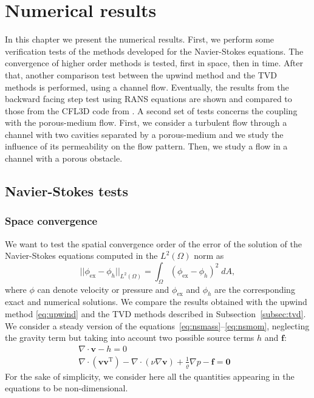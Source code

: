 \chapter{Numerical results} \label{chap:results}
In this chapter we present the numerical results.
First, we perform some verification tests of the methods developed for the Navier-Stokes equations.
The convergence of higher order methods is tested, first in space, 
then in time. After that, another comparison test between the upwind 
method 
and the TVD methods is performed, using a channel flow. Eventually, the results 
from the backward facing step test using RANS equations are shown and 
compared to those from the CFL3D code from \cite{web:nasa}. 
A second set of tests concerns the coupling with the porous-medium flow. First, we consider a turbulent flow through a channel with two cavities separated by a porous-medium and we study the influence of its permeability on the flow pattern. Then, we study a flow in a channel with a porous obstacle.
%
%
\section{Navier-Stokes tests}
\subsection{Space convergence} \label{subsec:conv}
We want to test the spatial convergence order of the error of the 
solution of the Navier-Stokes equations computed in the $L^2(\Omega)$ norm as
\begin{equation}
	|\!|\phi_\text{ex} - \phi_h|\!|_{L^2(\Omega)} = \int_{\Omega} 
	(\phi_\text{ex} - 
	\phi_h)^2 \; dA,
\end{equation}
where $\phi$ can denote velocity or pressure and $\phi_\text{ex}$ and 
$\phi_h$ 
are the corresponding exact and numerical solutions.
We compare the results obtained with 
the upwind method \eqref{eq:upwind} and the TVD methods described in 
Subsection~\ref{subsec:tvd}.\\
We consider a steady version of the 
equations~\eqref{eq:nsmass}--\eqref{eq:nsmom}, neglecting the gravity term but taking into account two possible source terms $h$ and $\mathbf{f}$:
\begin{align}
	\label{eq:nssteadymass} \nabla \cdot \mathbf{v} -h = 0&\\
	\label{eq:nssteadymom} \nabla \cdot (\mathbf{v} \mathbf{v}^\mathrm{T}) - 
	\nabla \cdot (\nu \nabla \mathbf{v}) + \frac{1}{\varrho}\nabla p  
	-\mathbf{f} = \mathbf{0}&
\end{align}
For the sake of simplicity, we consider here 
all the quantities appearing in the equations to be non-dimensional.
%
